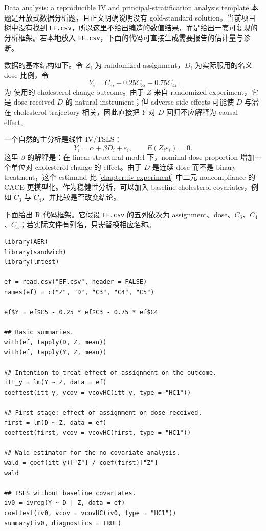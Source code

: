 \begin{exercisesolution}{Data analysis: \citet{efron1991compliance}}{a reproducible IV and principal-stratification analysis template}
本题是开放式数据分析题，且正文明确说明没有 gold-standard solution。当前项目树中没有找到 \texttt{EF.csv}，所以这里不给出编造的数值结果，而是给出一套可复现的分析框架。若本地放入 \texttt{EF.csv}，下面的代码可直接生成需要报告的估计量与诊断。

数据的基本结构如下。令 $Z_i$ 为 randomized assignment，$D_i$ 为实际服用的名义 dose 比例，令
\[
Y_i=C_{5i}-0.25C_{3i}-0.75C_{4i}
\]
为 \citet{efron1991compliance} 使用的 cholesterol change outcome。由于 $Z$ 来自 randomized experiment，它是 dose received $D$ 的 natural instrument；但 adverse side effects 可能使 $D$ 与潜在 cholesterol trajectory 相关，因此直接把 $Y$ 对 $D$ 回归不应解释为 causal effect。

一个自然的主分析是线性 IV/TSLS：
\[
Y_i=\alpha+\beta D_i+\varepsilon_i,
\qquad
E(Z_i\varepsilon_i)=0.
\]
这里 $\beta$ 的解释是：在 linear structural model 下，nominal dose proportion 增加一个单位对 cholesterol change 的 effect。由于 $D$ 是连续 dose 而不是 binary treatment，这个 estimand 比 \cref{chapter::iv-experiment} 中二元 noncompliance 的 CACE 更模型化。作为稳健性分析，可以加入 baseline cholesterol covariates，例如 $C_3$ 与 $C_4$，并比较是否改变结论。

下面给出 R 代码框架。它假设 \texttt{EF.csv} 的五列依次为 assignment、dose、$C_3$、$C_4$、$C_5$；若实际文件有列名，只需替换相应名称。

\begin{lstlisting}
library(AER)
library(sandwich)
library(lmtest)

ef = read.csv("EF.csv", header = FALSE)
names(ef) = c("Z", "D", "C3", "C4", "C5")

ef$Y = ef$C5 - 0.25 * ef$C3 - 0.75 * ef$C4

## Basic summaries.
with(ef, tapply(D, Z, mean))
with(ef, tapply(Y, Z, mean))

## Intention-to-treat effect of assignment on the outcome.
itt_y = lm(Y ~ Z, data = ef)
coeftest(itt_y, vcov = vcovHC(itt_y, type = "HC1"))

## First stage: effect of assignment on dose received.
first = lm(D ~ Z, data = ef)
coeftest(first, vcov = vcovHC(first, type = "HC1"))

## Wald estimator for the no-covariate analysis.
wald = coef(itt_y)["Z"] / coef(first)["Z"]
wald

## TSLS without baseline covariates.
iv0 = ivreg(Y ~ D | Z, data = ef)
coeftest(iv0, vcov = vcovHC(iv0, type = "HC1"))
summary(iv0, diagnostics = TRUE)


\end{lstlisting}
\end{exercisesolution}
